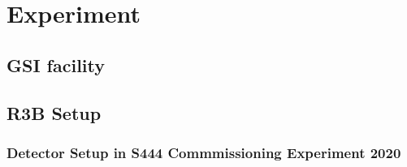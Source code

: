 \section{Experiment}
\subsection{GSI facility}
\subsection{R3B Setup}
\subsubsection{Detector Setup in S444 Commmissioning Experiment 2020}


